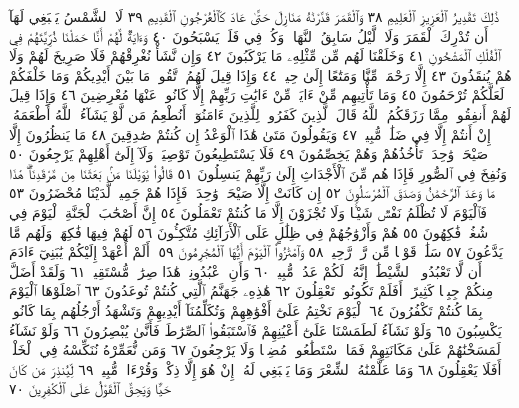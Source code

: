 ذَٰلِكَ تَقْدِيرُ ٱلْعَزِيزِ ٱلْعَلِيمِ ٣٨ وَٱلْقَمَرَ قَدَّرْنَٰهُ مَنَازِلَ حَتَّىٰ
عَادَ كَٱلْعُرْجُونِ ٱلْقَدِيمِ ٣٩ لَا ٱلشَّمْسُ يَنۢبَغِي لَهَآ أَن تُدْرِكَ
ٱلْقَمَرَ وَلَا ٱلَّيْلُ سَابِقُ ٱلنَّهَارِۚ وَكُلࣱّ فِي فَلَكࣲ يَسْبَحُونَ ٤٠
وَءَايَةࣱ لَّهُمْ أَنَّا حَمَلْنَا ذُرِّيَّتَهُمْ فِي ٱلْفُلْكِ ٱلْمَشْحُونِ ٤١ وَخَلَقْنَا
لَهُم مِّن مِّثْلِهِۦ مَا يَرْكَبُونَ ٤٢ وَإِن نَّشَأْ نُغْرِقْهُمْ فَلَا صَرِيخَ لَهُمْ
وَلَا هُمْ يُنقَذُونَ ٤٣ إِلَّا رَحْمَةࣰ مِّنَّا وَمَتَٰعًا إِلَىٰ حِينࣲ ٤٤ وَإِذَا
قِيلَ لَهُمُ ٱتَّقُوا۟ مَا بَيْنَ أَيْدِيكُمْ وَمَا خَلْفَكُمْ لَعَلَّكُمْ تُرْحَمُونَ ٤٥
وَمَا تَأْتِيهِم مِّنْ ءَايَةࣲ مِّنْ ءَايَٰتِ رَبِّهِمْ إِلَّا كَانُوا۟ عَنْهَا
مُعْرِضِينَ ٤٦ وَإِذَا قِيلَ لَهُمْ أَنفِقُوا۟ مِمَّا رَزَقَكُمُ ٱللَّهُ قَالَ ٱلَّذِينَ
كَفَرُوا۟ لِلَّذِينَ ءَامَنُوٓا۟ أَنُطْعِمُ مَن لَّوْ يَشَآءُ ٱللَّهُ أَطْعَمَهُۥٓ إِنْ
أَنتُمْ إِلَّا فِي ضَلَٰلࣲ مُّبِينࣲ ٤٧ وَيَقُولُونَ مَتَىٰ هَٰذَا ٱلْوَعْدُ إِن كُنتُمْ
صَٰدِقِينَ ٤٨ مَا يَنظُرُونَ إِلَّا صَيْحَةࣰ وَٰحِدَةࣰ تَأْخُذُهُمْ وَهُمْ
يَخِصِّمُونَ ٤٩ فَلَا يَسْتَطِيعُونَ تَوْصِيَةࣰ وَلَآ إِلَىٰٓ أَهْلِهِمْ
يَرْجِعُونَ ٥٠ وَنُفِخَ فِي ٱلصُّورِ فَإِذَا هُم مِّنَ ٱلْأَجْدَاثِ إِلَىٰ رَبِّهِمْ
يَنسِلُونَ ٥١ قَالُوا۟ يَٰوَيْلَنَا مَنۢ بَعَثَنَا مِن مَّرْقَدِنَاۜۗ هَٰذَا مَا وَعَدَ
ٱلرَّحْمَٰنُ وَصَدَقَ ٱلْمُرْسَلُونَ ٥٢ إِن كَانَتْ إِلَّا صَيْحَةࣰ
وَٰحِدَةࣰ فَإِذَا هُمْ جَمِيعࣱ لَّدَيْنَا مُحْضَرُونَ ٥٣ فَٱلْيَوْمَ لَا تُظْلَمُ
نَفْسࣱ شَيْـࣰٔا وَلَا تُجْزَوْنَ إِلَّا مَا كُنتُمْ تَعْمَلُونَ ٥٤
إِنَّ أَصْحَٰبَ ٱلْجَنَّةِ ٱلْيَوْمَ فِي شُغُلࣲ فَٰكِهُونَ ٥٥ هُمْ وَأَزْوَٰجُهُمْ
فِي ظِلَٰلٍ عَلَى ٱلْأَرَآئِكِ مُتَّكِـُٔونَ ٥٦ لَهُمْ فِيهَا فَٰكِهَةࣱ
وَلَهُم مَّا يَدَّعُونَ ٥٧ سَلَٰمࣱ قَوْلࣰا مِّن رَّبࣲّ رَّحِيمࣲ ٥٨ وَٱمْتَٰزُوا۟
ٱلْيَوْمَ أَيُّهَا ٱلْمُجْرِمُونَ ٥٩۞ أَلَمْ أَعْهَدْ إِلَيْكُمْ يَٰبَنِيٓ ءَادَمَ
أَن لَّا تَعْبُدُوا۟ ٱلشَّيْطَٰنَۖ إِنَّهُۥ لَكُمْ عَدُوࣱّ مُّبِينࣱ ٦٠ وَأَنِ
ٱعْبُدُونِيۚ هَٰذَا صِرَٰطࣱ مُّسْتَقِيمࣱ ٦١ وَلَقَدْ أَضَلَّ مِنكُمْ
جِبِلࣰّا كَثِيرًاۖ أَفَلَمْ تَكُونُوا۟ تَعْقِلُونَ ٦٢ هَٰذِهِۦ جَهَنَّمُ ٱلَّتِي
كُنتُمْ تُوعَدُونَ ٦٣ ٱصْلَوْهَا ٱلْيَوْمَ بِمَا كُنتُمْ تَكْفُرُونَ ٦٤
ٱلْيَوْمَ نَخْتِمُ عَلَىٰٓ أَفْوَٰهِهِمْ وَتُكَلِّمُنَآ أَيْدِيهِمْ وَتَشْهَدُ أَرْجُلُهُم
بِمَا كَانُوا۟ يَكْسِبُونَ ٦٥ وَلَوْ نَشَآءُ لَطَمَسْنَا عَلَىٰٓ أَعْيُنِهِمْ
فَٱسْتَبَقُوا۟ ٱلصِّرَٰطَ فَأَنَّىٰ يُبْصِرُونَ ٦٦ وَلَوْ نَشَآءُ لَمَسَخْنَٰهُمْ
عَلَىٰ مَكَانَتِهِمْ فَمَا ٱسْتَطَٰعُوا۟ مُضِيࣰّا وَلَا يَرْجِعُونَ ٦٧
وَمَن نُّعَمِّرْهُ نُنَكِّسْهُ فِي ٱلْخَلْقِۚ أَفَلَا يَعْقِلُونَ ٦٨ وَمَا
عَلَّمْنَٰهُ ٱلشِّعْرَ وَمَا يَنۢبَغِي لَهُۥٓۚ إِنْ هُوَ إِلَّا ذِكْرࣱ وَقُرْءَانࣱ مُّبِينࣱ ٦٩
لِّيُنذِرَ مَن كَانَ حَيࣰّا وَيَحِقَّ ٱلْقَوْلُ عَلَى ٱلْكَٰفِرِينَ ٧٠
